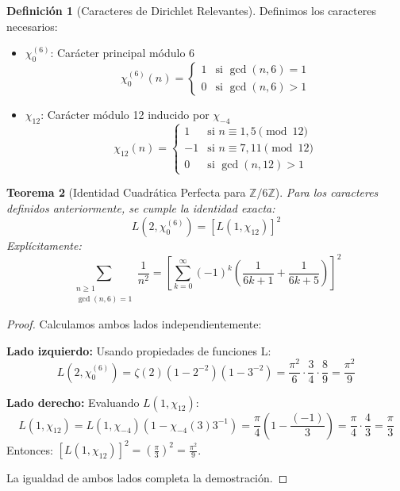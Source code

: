 \documentclass[12pt, a4paper]{article}
\theoremstyle{plain}
\newtheorem{teorema}{Teorema}[section]
\theoremstyle{definition}
\newtheorem{definicion}[teorema]{Definición}
\theoremstyle{remark}
\begin{document}
\begin{definicion}[Caracteres de Dirichlet Relevantes]
Definimos los caracteres necesarios:
\begin{itemize}
    \item $\chi_0^{(6)}$: Carácter principal módulo 6
    \[
    \chi_0^{(6)}(n) = \begin{cases} 
    1 & \text{si } \gcd(n,6)=1 \\
    0 & \text{si } \gcd(n,6)>1 
    \end{cases}
    \]
    
    \item $\chi_{12}$: Carácter módulo 12 inducido por $\chi_{-4}$
    \[
    \chi_{12}(n) = \begin{cases}
    1 & \text{si } n \equiv 1, 5 \pmod{12} \\
    -1 & \text{si } n \equiv 7, 11 \pmod{12} \\
    0 & \text{si } \gcd(n,12)>1
    \end{cases}
    \]
\end{itemize}
\end{definicion}

\begin{teorema}[Identidad Cuadrática Perfecta para $\mathbb{Z}/6\mathbb{Z}$]
\label{teo:identidad_cuadratica}
Para los caracteres definidos anteriormente, se cumple la identidad exacta:
\[
L(2,\chi_0^{(6)}) = [L(1,\chi_{12})]^2
\]
Explícitamente:
\[
\sum_{\substack{n \geq 1 \\ \gcd(n,6)=1}} \frac{1}{n^2} = \left[ \sum_{k=0}^\infty (-1)^k \left( \frac{1}{6k+1} + \frac{1}{6k+5} \right) \right]^2
\]
\end{teorema}

\begin{proof}
Calculamos ambos lados independientemente:

\textbf{Lado izquierdo:} Usando propiedades de funciones L:
\[
L(2,\chi_0^{(6)}) = \zeta(2)(1-2^{-2})(1-3^{-2}) = \frac{\pi^2}{6} \cdot \frac{3}{4} \cdot \frac{8}{9} = \frac{\pi^2}{9}
\]

\textbf{Lado derecho:} Evaluando $L(1,\chi_{12})$:
\[
L(1,\chi_{12}) = L(1,\chi_{-4})(1 - \chi_{-4}(3)3^{-1}) = \frac{\pi}{4} \left(1 - \frac{(-1)}{3}\right) = \frac{\pi}{4} \cdot \frac{4}{3} = \frac{\pi}{3}
\]
Entonces: $[L(1,\chi_{12})]^2 = \left(\frac{\pi}{3}\right)^2 = \frac{\pi^2}{9}$.

La igualdad de ambos lados completa la demostración.
\end{proof}
\end{document}

